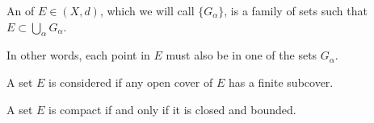 \documentclass{book}
\begin{document}
\begin{defn}
    An  of $E \in (X, d)$, which we will call $\{ G_\alpha \}$, is a family of sets such that $E \subset \bigcup_\alpha G_\alpha$.

    In other words, each point in $E$ must also be in one of the sets $G_\alpha$.
\end{defn}

\begin{defn}[Compact]
    A set $E$ is considered  if any open cover of $E$ has a finite subcover.
\end{defn}

\begin{thm}
    A set $E$ is compact if and only if it is closed and bounded.
\end{thm}
\end{document}
